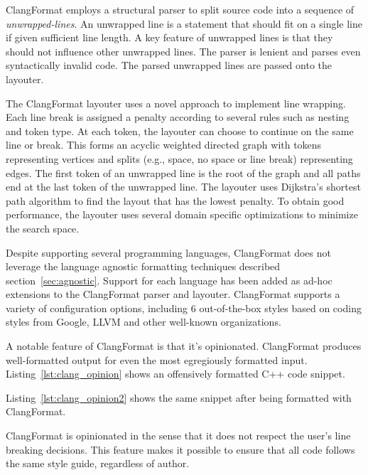ClangFormat employs a structural parser to split source code into a sequence of \emph{unwrapped-lines}.
An unwrapped line is a statement that should fit on a single line if given sufficient line length.
A key feature of unwrapped lines is that they should not influence other unwrapped lines.
The parser is lenient and parses even syntactically invalid code.
The parsed unwrapped lines are passed onto the layouter.

The ClangFormat layouter uses a novel approach to implement line wrapping.
Each line break is assigned a penalty according to several rules such as nesting and token type.
At each token, the layouter can choose to continue on the same line or break.
This forms an acyclic weighted directed graph with tokens representing vertices and splits (e.g., space, no space or line break) representing edges.
The first token of an unwrapped line is the root of the graph and all paths end at the last token of the unwrapped line.
The layouter uses Dijkstra's\autocite{dijkstra_note_1959} shortest path algorithm to find the layout that has the lowest penalty.
To obtain good performance, the layouter uses several domain specific optimizations to minimize the search space.

Despite supporting several programming languages, ClangFormat does not leverage the language agnostic formatting techniques described section~\ref{sec:agnostic}.
Support for each language has been added as ad-hoc extensions to the ClangFormat parser and layouter.
ClangFormat supports a variety of configuration options, including 6 out-of-the-box styles based on coding styles from Google, LLVM and other well-known organizations.

A notable feature of ClangFormat is that it's opinionated.
ClangFormat produces well-formatted output for even the most egregiously formatted input.
Listing~\ref{lst:clang_opinion} shows an offensively formatted C++ code snippet.

Listing~\ref{lst:clang_opinion2} shows the same snippet after being formatted with ClangFormat.

ClangFormat is opinionated in the sense that it does not respect the user's line breaking decisions.
This feature makes it possible to ensure that all code follows the same style guide, regardless of author.

